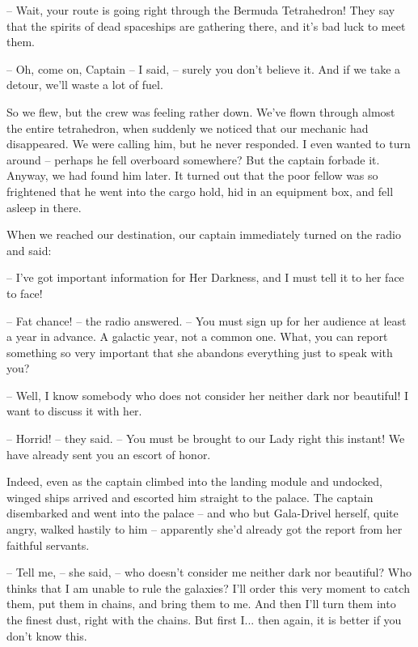 \documentclass[ebook,twoside,final,openright]{memoir}
\begin{document}
– Wait, your route is going right through the Bermuda Tetrahedron! They say that the spirits of dead spaceships are gathering there, and it’s bad luck to meet them.\par
– Oh, come on, Captain – I said, – surely you don’t believe it. And if we take a detour, we’ll waste a lot of fuel.\par
\par
So we flew, but the crew was feeling rather down. We’ve flown through almost the entire tetrahedron, when suddenly we noticed that our mechanic had disappeared. We were calling him, but he never responded. I even wanted to turn around – perhaps he fell overboard somewhere? But the captain forbade it. Anyway, we had found him later. It turned out that the poor fellow was so frightened that he went into the cargo hold, hid in an equipment box, and fell asleep in there.\par
\par
When we reached our destination, our captain immediately turned on the radio and said:\par
– I've got important information for Her Darkness, and I must tell it to her face to face!\par
– Fat chance! – the radio answered. – You must sign up for her audience at least a year in advance. A galactic year, not a common one. What, you can report something so very important that she abandons everything just to speak with you?\par
– Well, I know somebody who does not consider her neither dark nor beautiful! I want to discuss it with her.\par
– Horrid! – they said. – You must be brought to our Lady right this instant! We have already sent you an escort of honor.\par
\par
Indeed, even as the captain climbed into the landing module and undocked, winged ships arrived and escorted him straight to the palace. The captain disembarked and went into the palace – and who but Gala-Drivel herself, quite angry, walked hastily to him – apparently she’d already got the report from her faithful servants.\par
– Tell me, – she said, – who doesn’t consider me neither dark nor beautiful? Who thinks that I am unable to rule the galaxies? I’ll order this very moment to catch them, put them in chains, and bring them to me. And then I’ll turn them into the finest dust, right with the chains. But first I... then again, it is better if you don’t know this.\par
\end{document}
